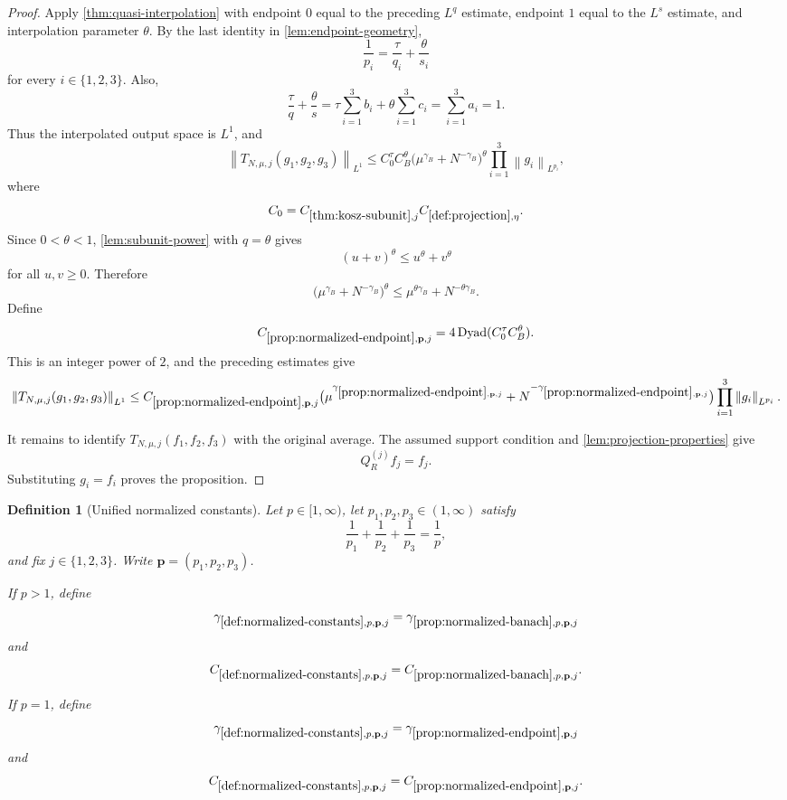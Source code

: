 \documentclass[11pt]{article}
\newtheorem{definition}[theorem]{Definition}
\newcommand{\Dyad}{\operatorname{Dyad}}
\newcommand{\norm}[2]{\left\lVert #1\right\rVert_{#2}}
\newcommand{\Cst}[2]{C_{\ref{#1},#2}}
\newcommand{\Gam}[2]{\gamma_{\ref{#1},#2}}
\newcommand{\indices}{\{1,2,3\}}
\begin{document}
\begin{proof}
		Apply \cref{thm:quasi-interpolation} with endpoint \(0\) equal to the preceding \(L^q\) estimate, endpoint \(1\) equal to the \(L^s\) estimate, and interpolation parameter \(\theta\).  By the last identity in \cref{lem:endpoint-geometry},
		\[
		\frac1{p_i}=\frac\tau{q_i}+\frac\theta{s_i}
		\]
		for every \(i\in\indices\).  Also,
		\[
		\frac\tau q+\frac\theta s
		=
		\tau\sum_{i=1}^{3}b_i+\theta\sum_{i=1}^{3}c_i
		=
		\sum_{i=1}^{3}a_i
		=
		1.
		\]
		Thus the interpolated output space is \(L^1\), and
		\[
		\norm{T_{N,\mu,j}(g_1,g_2,g_3)}{L^1}
		\leq
		C_0^\tau C_B^\theta
		\bigl(\mu^{\gamma_B}+N^{-\gamma_B}\bigr)^\theta
		\prod_{i=1}^{3}\norm{g_i}{L^{p_i}},
		\]
		where
		\[
		C_0=\Cst{thm:kosz-subunit}{j}\Cst{def:projection}{\eta}.
		\]
		Since \(0<\theta<1\), \cref{lem:subunit-power} with \(q=\theta\) gives
		\[
		(u+v)^\theta\leq u^\theta+v^\theta
		\]
		for all \(u,v\geq0\).  Therefore
		\[
		\bigl(\mu^{\gamma_B}+N^{-\gamma_B}\bigr)^\theta
		\leq
		\mu^{\theta\gamma_B}+N^{-\theta\gamma_B}.
		\]
		Define
		\[
		\Cst{prop:normalized-endpoint}{\mathbf p,j}
		=
		4\Dyad(C_0^\tau C_B^\theta).
		\]
		This is an integer power of \(2\), and the preceding estimates give
		\[
		\norm{T_{N,\mu,j}(g_1,g_2,g_3)}{L^1}
		\leq
		\Cst{prop:normalized-endpoint}{\mathbf p,j}
		\bigl(\mu^{\Gam{prop:normalized-endpoint}{\mathbf p,j}}
		+N^{-\Gam{prop:normalized-endpoint}{\mathbf p,j}}\bigr)
		\prod_{i=1}^{3}\norm{g_i}{L^{p_i}}.
		\]
		
		It remains to identify \(T_{N,\mu,j}(f_1,f_2,f_3)\) with the original average.  The assumed support condition and \cref{lem:projection-properties} give
		\[
		Q_R^{(j)}f_j=f_j.
		\]
		Substituting \(g_i=f_i\) proves the proposition.
	\end{proof}
	
	\begin{definition}[Unified normalized constants]\label{def:normalized-constants}
		Let \(p\in[1,\infty)\), let \(p_1,p_2,p_3\in(1,\infty)\) satisfy
		\[
		\frac1{p_1}+\frac1{p_2}+\frac1{p_3}=\frac1p,
		\]
		and fix \(j\in\indices\).  Write \(\mathbf p=(p_1,p_2,p_3)\).
		
		If \(p>1\), define
		\[
		\Gam{def:normalized-constants}{p,\mathbf p,j}
		=
		\Gam{prop:normalized-banach}{p,\mathbf p,j}
		\]
		and
		\[
		\Cst{def:normalized-constants}{p,\mathbf p,j}
		=
		\Cst{prop:normalized-banach}{p,\mathbf p,j}.
		\]
		
		If \(p=1\), define
		\[
		\Gam{def:normalized-constants}{p,\mathbf p,j}
		=
		\Gam{prop:normalized-endpoint}{\mathbf p,j}
		\]
		and
		\[
		\Cst{def:normalized-constants}{p,\mathbf p,j}
		=
		\Cst{prop:normalized-endpoint}{\mathbf p,j}.
		\]
	\end{definition}
	
\end{document}
